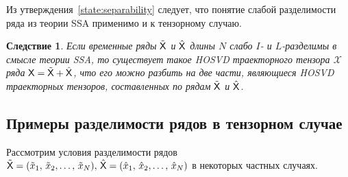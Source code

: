 \documentclass[specialist,
    substylefile = spbu_report.rtx,
    subf,href,colorlinks=true, 12pt]{disser}
\theoremstyle{plain}
\newtheorem{corollary}{Следствие}[statement]
\theoremstyle{definition}
\theoremstyle{remark}
\begin{document}
    Из утверждения~\ref{state:separability} следует, что понятие слабой разделимости ряда из теории SSA
    применимо и к тензорному случаю.
    \begin{corollary}
        Если временные ряды $\tilde{\mathsf{X}}$ и $\hat{\mathsf{X}}$ длины $N$ слабо $I$- и $L$-разделимы в смысле теории \emph{SSA},
        то существует такое \emph{HOSVD} траекторного тензора $\mathcal{X}$ ряда $\mathsf{X}=\tilde{\mathsf{X}} + \hat{\mathsf{X}}$, что его можно разбить
        на две части, являющиеся \emph{HOSVD} траекторных тензоров, составленных по рядам $\tilde{\mathsf{X}}$ и $\hat{\mathsf{X}}$.
    \end{corollary}

    \subsection{Примеры разделимости рядов в тензорном случае}\label{subsec:separation-example}
    Рассмотрим условия разделимости рядов $\tilde{\mathsf{X}}=(\tilde{x}_{1},\, \tilde{x}_{2},\ldots,\, \tilde{x}_{N}),\, \hat{\mathsf{X}}=
    (\hat{x}_{1},\, \hat{x}_{2},\ldots,\, \hat{x}_{N})$ в некоторых частных случаях.
\end{document}
